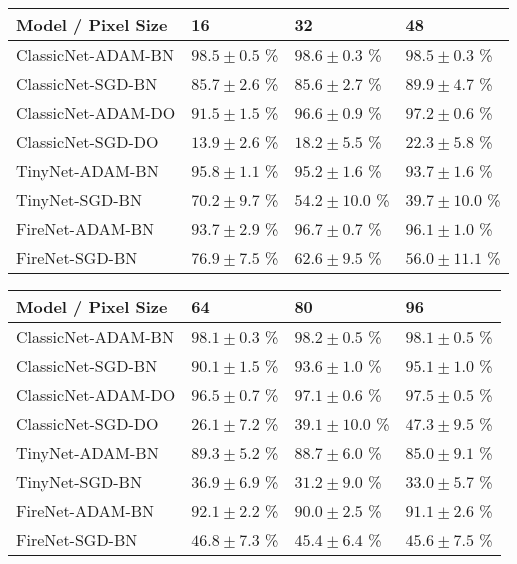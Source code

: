 \begin{table*}[!ht]
    \centering
	\forceversofloat
	\begin{tabular}{llll}
		\hline 
		Model / Pixel Size 			& 16 				   & 32 				    & 48\\ 
		\hline
		ClassicNet-ADAM-BN  & $98.5 \pm 0.5$ \%    & $98.6 \pm 0.3$ \%  & $98.5 \pm 0.3$ \%\\
		ClassicNet-SGD-BN 	& $85.7 \pm 2.6$ \%    & $85.6 \pm 2.7$ \%  & $89.9 \pm 4.7$ \%\\
		ClassicNet-ADAM-DO  & $91.5 \pm 1.5$ \%    & $96.6 \pm 0.9$ \%  & $97.2 \pm 0.6$ \%\\
		ClassicNet-SGD-DO 	& $13.9 \pm 2.6$ \%    & $18.2 \pm 5.5$ \%  & $22.3 \pm 5.8$ \%\\
		\hline
		TinyNet-ADAM-BN 	& $95.8 \pm 1.1$ \%    & $95.2 \pm 1.6$ \%  & $93.7 \pm 1.6$ \%\\
		TinyNet-SGD-BN 	    & $70.2 \pm 9.7$ \%    & $54.2 \pm 10.0$ \% & $39.7 \pm 10.0$ \%\\
		\hline
		FireNet-ADAM-BN  	& $93.7 \pm 2.9$ \%    & $96.7 \pm 0.7$ \%  & $96.1 \pm 1.0$ \%\\
		FireNet-SGD-BN 		& $76.9 \pm 7.5$ \%    & $62.6 \pm 9.5$ \%  & $56.0 \pm 11.1$ \%\\
		\hline 
	\end{tabular}
    \begin{tabular}{llll}
        \hline 
        Model / Pixel Size 			& 64 				  & 80 				& 96\\ 
        \hline
        ClassicNet-ADAM-BN  & $98.1 \pm 0.3$ \% & $98.2 \pm 0.5$ \% & $98.1 \pm 0.5$ \%\\
        ClassicNet-SGD-BN 	& $90.1 \pm 1.5$ \% & $93.6 \pm 1.0$ \% & $95.1 \pm 1.0$ \%\\
        ClassicNet-ADAM-DO  & $96.5 \pm 0.7$ \% & $97.1 \pm 0.6$ \% & $97.5 \pm 0.5$ \%\\
        ClassicNet-SGD-DO 	& $26.1 \pm 7.2$ \% & $39.1 \pm 10.0$ \% & $47.3 \pm 9.5$ \%\\
        \hline
        TinyNet-ADAM-BN 	& $89.3 \pm 5.2$ \% & $88.7 \pm 6.0$ \% & $85.0 \pm 9.1$ \%\\
        TinyNet-SGD-BN 	    & $36.9 \pm 6.9$ \% & $31.2 \pm 9.0$ \% & $33.0 \pm 5.7$ \%\\
        \hline
        FireNet-ADAM-BN  	& $92.1 \pm 2.2$ \% & $90.0 \pm 2.5$ \% & $91.1 \pm 2.6$ \%\\
        FireNet-SGD-BN 		& $46.8 \pm 7.3$ \% & $45.4 \pm 6.4$ \% & $45.6 \pm 7.5$ \%\\
        \hline 
    \end{tabular}
    \vspace*{0.5cm}
	\caption{Numerical summary of the effect of object size/scale for different CNN models.}
	\label{lim:numericalObjectSize}
\end{table*}

